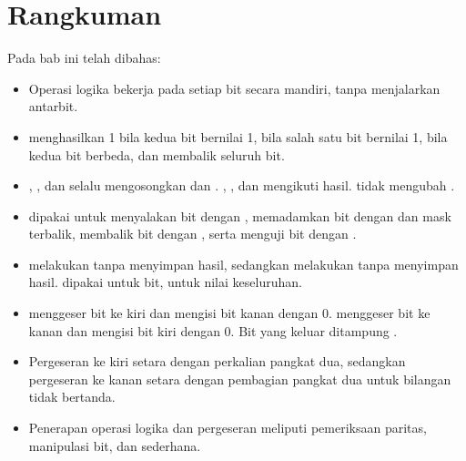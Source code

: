 \section{Rangkuman}
\label{sec:rangkuman-bab11}

Pada bab ini telah dibahas:

\begin{itemize}
    \item Operasi logika bekerja pada setiap bit secara mandiri,
          tanpa menjalarkan  antarbit.

    \item {} menghasilkan 1 bila kedua bit bernilai 1,
           bila salah satu bit bernilai 1,  bila
          kedua bit berbeda, dan  membalik seluruh bit.

    \item {}, , dan  selalu mengosongkan
           dan . , , dan
           mengikuti hasil.  tidak mengubah
          .

    \item {} dipakai untuk menyalakan bit dengan ,
          memadamkan bit dengan  dan mask terbalik,
          membalik bit dengan , serta menguji bit dengan
          .

    \item {} melakukan  tanpa menyimpan hasil,
          sedangkan  melakukan  tanpa menyimpan
          hasil.  dipakai untuk bit,  untuk nilai
          keseluruhan.

    \item {} menggeser bit ke kiri dan mengisi bit kanan
          dengan 0.  menggeser bit ke kanan dan mengisi bit
          kiri dengan 0. Bit yang keluar ditampung .

    \item Pergeseran ke kiri setara dengan perkalian pangkat dua,
          sedangkan pergeseran ke kanan setara dengan pembagian
          pangkat dua untuk bilangan tidak bertanda.

    \item Penerapan operasi logika dan pergeseran meliputi
          pemeriksaan paritas, manipulasi bit, dan 
          sederhana.
\end{itemize}

